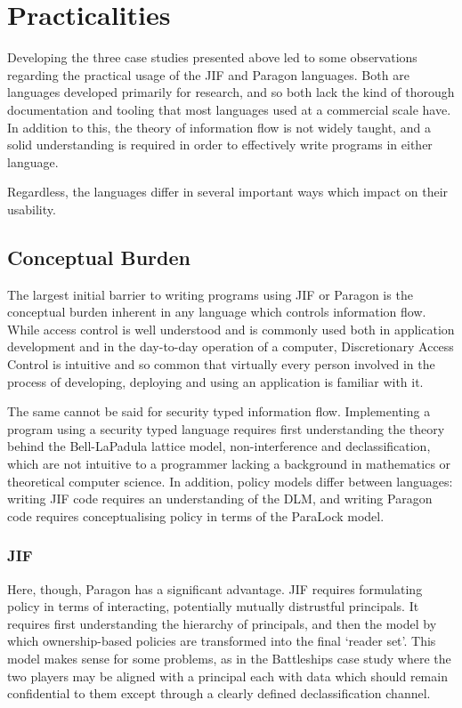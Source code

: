 \section{Practicalities}

Developing the three case studies presented above led to some observations regarding the practical usage of the JIF and Paragon languages. Both are languages developed primarily for research, and so both lack the kind of thorough documentation and tooling that most languages used at a commercial scale have. In addition to this, the theory of information flow is not widely taught, and a solid understanding is required in order to effectively write programs in either language.

Regardless, the languages differ in several important ways which impact on their usability.

\subsection{Conceptual Burden}

The largest initial barrier to writing programs using JIF or Paragon is the conceptual burden inherent in any language which controls information flow. While access control is well understood and is commonly used both in application development and in the day-to-day operation of a computer, Discretionary Access Control is intuitive and so common that virtually every person involved in the process of developing, deploying and using an application is familiar with it.

The same cannot be said for security typed information flow. Implementing a program using a security typed language requires first understanding the theory behind the Bell-LaPadula lattice model, non-interference and declassification, which are not intuitive to a programmer lacking a background in mathematics or theoretical computer science. In addition, policy models differ between languages: writing JIF code requires an understanding of the DLM, and writing Paragon code requires conceptualising policy in terms of the ParaLock model.

\subsubsection{JIF}

Here, though, Paragon has a significant advantage. JIF requires formulating policy in terms of interacting, potentially mutually distrustful principals. It requires first understanding the hierarchy of principals, and then the model by which ownership-based policies are transformed into the final `reader set'. This model makes sense for some problems, as in the Battleships case study where the two players may be aligned with a principal each with data which should remain confidential to them except through a clearly defined declassification channel.

